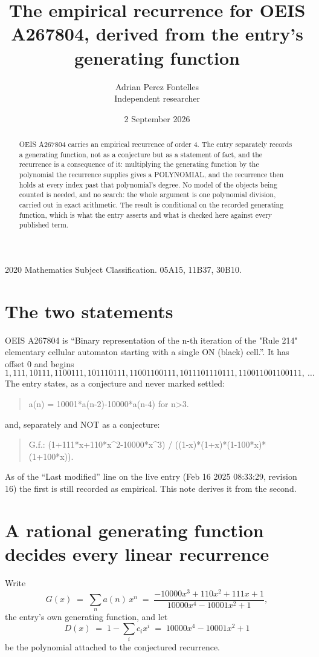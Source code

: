 \documentclass[11pt,a4paper]{article}
\title{The empirical recurrence for OEIS A267804, derived from the entry's generating function}
\author{Adrian Perez Fontelles\\ \small Independent researcher}
\date{2 September 2026}
\theoremstyle{plain}
\theoremstyle{definition}
\begin{document}
\maketitle

\begin{abstract}
OEIS A267804 carries an empirical recurrence of order $4$. The entry separately records a
generating function, not as a conjecture but as a statement of fact, and the recurrence is a
consequence of it: multiplying the generating function by the polynomial the recurrence
supplies gives a POLYNOMIAL, and the recurrence then holds at every index past that
polynomial's degree. No model of the objects being counted is needed, and no search: the
whole argument is one polynomial division, carried out in exact arithmetic. The result is
conditional on the recorded generating function, which is what the entry asserts and what is
checked here against every published term.
\end{abstract}

\noindent\small 2020 Mathematics Subject Classification. 05A15, 11B37, 30B10.\normalsize

\section{The two statements}

OEIS A267804 is ``Binary representation of the n-th iteration of the "Rule 214" elementary cellular automaton starting with a single ON (black) cell.''. It has offset $0$ and begins
\[
1, 111, 10111, 1100111, 101110111, 11001100111, 1011101110111, 110011001100111,\ \dots
\]
The entry states, as a conjecture and never marked settled:
\begin{quote}
a(n) = 10001*a(n-2)-10000*a(n-4) for n>3.
\end{quote}
and, separately and NOT as a conjecture:
\begin{quote}
G.f.: (1+111*x+110*x\^{}2-10000*x\^{}3) / ((1-x)*(1+x)*(1-100*x)*(1+100*x)).
\end{quote}
As of the ``Last modified'' line on the live entry (Feb 16 2025 08:33:29, revision 16) the first is still
recorded as empirical. This note derives it from the second.

\section{A rational generating function decides every linear recurrence}

Write
\[
G(x)\;=\;\sum_{n}a(n)\,x^{n}\;=\;\frac{- 10000 x^{3} + 110 x^{2} + 111 x + 1}{10000 x^{4} - 10001 x^{2} + 1},
\]
the entry's own generating function, and let
\[
D(x)\;=\;1-\sum_i c_i x^{i}\;=\;10000 x^{4} - 10001 x^{2} + 1
\]
be the polynomial attached to the conjectured recurrence.
\end{document}
